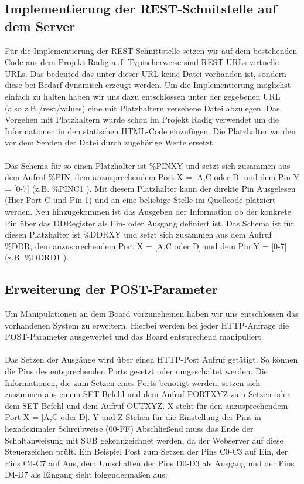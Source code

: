\subsection{Implementierung der REST-Schnitstelle auf dem Server}
Für die Implementierung der \ac{REST}-Schnittstelle setzen wir auf dem
bestehenden Code aus dem Projekt Radig auf. Typischerweise sind
\ac{REST}-\ac{URL}s virtuelle \ac{URL}s.
Das bedeuted das unter dieser \ac{URL} keine Datei vorhanden ist, sondern diese bei
Bedarf dynamisch erzeugt werden. Um die Implementierung möglichst einfach zu
halten haben wir uns dazu entschlossen unter der gegebenen \ac{URL} (also z.B  
\textrm{/rest/values}) eine mit Platzhaltern versehene Datei abzulegen. Das
Vorgehen mit Platzhaltern wurde schon im Projekt Radig verwendet um die
Informationen in den statischen \ac{HTML}-Code einzufügen. Die Platzhalter
werden vor dem Senden der Datei durch zugehörige Werte ersetzt.\\
\\
Das Schema für so einen Platzhalter ist \textrm{\%PINXY} und setzt sich zusammen aus dem
Aufruf \textrm{\%PIN}, dem anzusprechendem Port X = [A,C oder D] und dem Pin Y = [0-7] (z.B.
\textrm{\%PINC1 } ). Mit diesem Platzhalter kann der direkte Pin Ausgelesen
(Hier Port C und Pin 1) und an eine beliebige Stelle im Quellcode platziert werden. Neu
hinzugekommen ist das Ausgeben der Information ob der konkrete Pin über das
DDRegister als Ein- oder Ausgang definiert ist. Das Schema ist für diesen
Platzhalter ist \textrm{\%DDRXY} und setzt sich zusammen aus dem Aufruf \textrm{\%DDR}, dem
anzusprechendem Port X = [A,C oder D] und dem Pin Y = [0-7] (z.B.
\textrm{\%DDRD1} ). 

\subsection{Erweiterung der POST-Parameter}
Um Manipulationen an dem Board vorzunehemen haben wir uns entschlossen das
vorhandenen System zu erweitern. Hierbei werden bei jeder \ac{HTTP}-Anfrage die
POST-Parameter ausgewertet und das Board entsprechend manipuliert.\\
\\
Das Setzen der Ausgänge wird über einen HTTP-Post Aufruf getätigt. So können die
Pins des entsprechenden Ports gesetzt oder umgeschaltet werden. Die
Informationen, die zum Setzen eines Ports benötigt werden, setzen sich zusammen
aus einem \textrm{SET} Befehl und dem Aufruf PORTXYZ zum Setzen oder dem
\textrm{SET} Befehl und dem Aufruf OUTXYZ. X steht für den anzusprechendem Port
X = [A,C oder D]. Y und Z Stehen für die Einstellung der Pins in hexadezimaler
Schreibweise (00-FF) Abschließend muss das Ende der Schaltanweisung mit
\textrm{SUB} gekennzeichnet werden, da der Webserver auf diese Steuerzeichen
prüft. Ein Beispiel Post zum Setzen der Pins C0-C3 auf Ein, der Pins C4-C7 auf
Aus, dem Umschalten der Pins D0-D3 als Ausgang und der Pins D4-D7 als Eingang
sieht folgendermaßen aus:
\\

